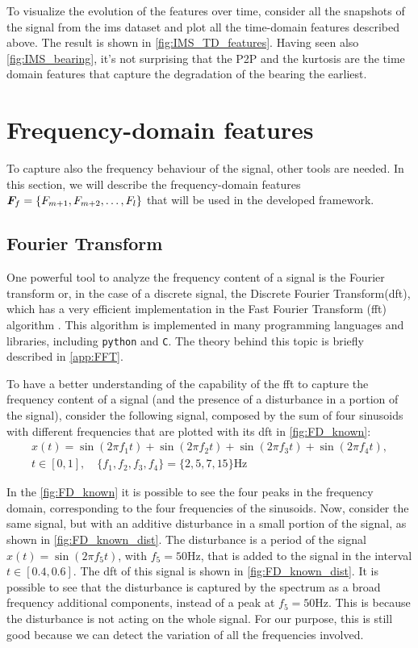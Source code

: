 To visualize the evolution of the features over time, consider all the snapshots of the  signal from the \gls{ims} dataset and plot all the time-domain features described above. The result is shown in \autoref{fig:IMS_TD_features}. Having seen also \autoref{fig:IMS_bearing}, it's not surprising that the P2P and the kurtosis are the time domain features that capture the degradation of the bearing the earliest. 


\section{Frequency-domain features}

To capture also the frequency behaviour of the signal, other tools are needed. In this section, we will describe the frequency-domain features  $\bm{F}_f = \{F_{m+1}, F_{m+2}, \dots, F_l\}$ that will be used in the developed framework.

\subsection{Fourier Transform}
\label{sec:FFT}

One powerful tool to analyze the frequency content of a signal is the Fourier transform or, in the case of a discrete signal, the Discrete Fourier Transform(\gls{dft}), which has a very efficient implementation in the Fast Fourier Transform (\gls{fft}) algorithm \cite{cooley1965algorithm}. This algorithm is implemented in many programming languages and libraries, including \texttt{python} and \texttt{C}. The theory behind this topic is briefly described in \autoref{app:FFT}. 

To have a better understanding of the capability of the \gls{fft} to capture the frequency content of a signal (and the presence of a disturbance in a portion of the signal), consider the following signal, composed by the sum of four sinusoids with different frequencies that are plotted with its \gls{dft} in \autoref{fig:FD_known}:
\begin{multline}
    x(t) = \sin(2\pi f_1 t) + \sin(2\pi f_2 t) + \sin(2\pi f_3 t) + \sin(2\pi f_4 t), \\
    t \in [0, 1], \quad \{f_1, f_2, f_3, f_4\} = \{2, 5, 7, 15\} \si{\Hz}
\end{multline}

In the \autoref{fig:FD_known} it is possible to see the four peaks in the frequency domain, corresponding to the four frequencies of the sinusoids. Now, consider the same signal, but with an additive disturbance in a small portion of the signal, as shown in \autoref{fig:FD_known_dist}. The disturbance is a period of the signal $x(t) = \sin(2\pi f_5 t)$, with $f_5=50\si{\Hz}$, that is added to the signal in the interval $t \in [0.4, 0.6]$. The \gls{dft} of this signal is shown in \autoref{fig:FD_known_dist}. It is possible to see that the disturbance is captured by the spectrum as a broad frequency additional components, instead of a peak at $f_5=50\si{\Hz}$. This is because the disturbance is not acting on the whole signal. For our purpose, this is still good because we can detect the variation of all the frequencies involved.

